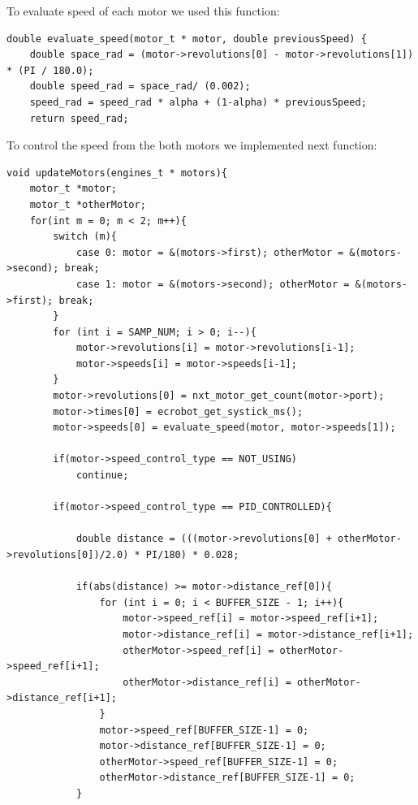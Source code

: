 \documentclass[a4paper,12pt,oneside]{article}
\begin{document}
\begin{enumerate}

\lstset{style=mystyle}

To evaluate speed of each motor we used this function: \\
 
\begin{lstlisting}[frame=single]  
double evaluate_speed(motor_t * motor, double previousSpeed) {
	double space_rad = (motor->revolutions[0] - motor->revolutions[1]) * (PI / 180.0);
	double speed_rad = space_rad/ (0.002);
	speed_rad = speed_rad * alpha + (1-alpha) * previousSpeed;
	return speed_rad;
\end{lstlisting}
	

To control the speed from the both motors we implemented next function: \\


\begin{lstlisting}[frame=single] 
void updateMotors(engines_t * motors){
	motor_t *motor;
    motor_t *otherMotor;
	for(int m = 0; m < 2; m++){
		switch (m){
			case 0: motor = &(motors->first); otherMotor = &(motors->second); break;
			case 1: motor = &(motors->second); otherMotor = &(motors->first); break;
		}
		for (int i = SAMP_NUM; i > 0; i--){
			motor->revolutions[i] = motor->revolutions[i-1];
			motor->speeds[i] = motor->speeds[i-1];
		}
		motor->revolutions[0] = nxt_motor_get_count(motor->port);
		motor->times[0] = ecrobot_get_systick_ms();
		motor->speeds[0] = evaluate_speed(motor, motor->speeds[1]);
		
		if(motor->speed_control_type == NOT_USING)
			continue;
		
		if(motor->speed_control_type == PID_CONTROLLED){

			double distance = (((motor->revolutions[0] + otherMotor->revolutions[0])/2.0) * PI/180) * 0.028;

			if(abs(distance) >= motor->distance_ref[0]){
				for (int i = 0; i < BUFFER_SIZE - 1; i++){
					motor->speed_ref[i] = motor->speed_ref[i+1];
					motor->distance_ref[i] = motor->distance_ref[i+1];
					otherMotor->speed_ref[i] = otherMotor->speed_ref[i+1];
					otherMotor->distance_ref[i] = otherMotor->distance_ref[i+1];
				}
				motor->speed_ref[BUFFER_SIZE-1] = 0;
				motor->distance_ref[BUFFER_SIZE-1] = 0;
				otherMotor->speed_ref[BUFFER_SIZE-1] = 0;
				otherMotor->distance_ref[BUFFER_SIZE-1] = 0;
			}
			

\end{lstlisting}
\end{enumerate}
\end{document}
